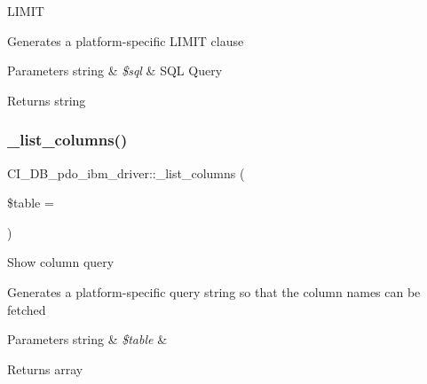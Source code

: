 L\+I\+M\+IT

Generates a platform-\/specific L\+I\+M\+IT clause


\begin{DoxyParams}[1]{Parameters}
string & {\em \$sql} & S\+QL Query \\
\hline
\end{DoxyParams}
\begin{DoxyReturn}{Returns}
string 
\end{DoxyReturn}
\mbox{\label{class_c_i___d_b__pdo__ibm__driver_ac31de1f47039ae542258e3378a6469f6}} 
\subsubsection{\texorpdfstring{\+\_\+list\+\_\+columns()}{\_list\_columns()}}
{\footnotesize\ttfamily C\+I\+\_\+\+D\+B\+\_\+pdo\+\_\+ibm\+\_\+driver\+::\+\_\+list\+\_\+columns (\begin{DoxyParamCaption}\item[{}]{\$table = {\ttfamily \textquotesingle{}\textquotesingle{}} }\end{DoxyParamCaption})\hspace{0.3cm}{\ttfamily [protected]}}

Show column query

Generates a platform-\/specific query string so that the column names can be fetched


\begin{DoxyParams}[1]{Parameters}
string & {\em \$table} & \\
\hline
\end{DoxyParams}
\begin{DoxyReturn}{Returns}
array 
\end{DoxyReturn}
\mbox{\label{class_c_i___d_b__pdo__ibm__driver_aeb530698c2aa8b80bd8fa149a8b7ccb4}} 
